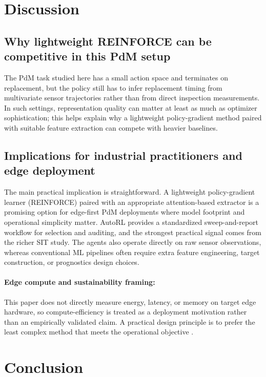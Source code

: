 \documentclass[sn-basic]{sn-jnl} %
\begin{document}
\section{Discussion}
\label{sec:discussion}
\subsection{Why lightweight REINFORCE can be competitive in this PdM setup}
The PdM task studied here has a small action space and terminates on replacement, but the policy still has to infer replacement timing from multivariate sensor trajectories rather than from direct inspection measurements. In such settings, representation quality can matter at least as much as optimizer sophistication; this helps explain why a lightweight policy-gradient method paired with suitable feature extraction can compete with heavier baselines.

\subsection{Implications for industrial practitioners and edge deployment}
The main practical implication is straightforward. A lightweight policy-gradient learner (\textsc{REINFORCE}) paired with an appropriate attention-based extractor is a promising option for edge-first PdM deployments where model footprint and operational simplicity matter. AutoRL provides a standardized sweep-and-report workflow for selection and auditing, and the strongest practical signal comes from the richer SIT study. The agents also operate directly on raw sensor observations, whereas conventional ML pipelines often require extra feature engineering, target construction, or prognostics design choices.

\paragraph{Edge compute and sustainability framing:}
This paper does not directly measure energy, latency, or memory on target edge hardware, so compute-efficiency is treated as a deployment motivation rather than an empirically validated claim. A practical design principle is to prefer the least complex method that meets the operational objective \cite{Schwartz2020, Strubell2019}.


\section{Conclusion}
\label{sec:conclusion}
\end{document}

